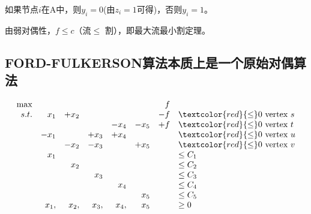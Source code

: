 \begin{itemize}
  \begin{small}
 \item  如果节点$i$在A中，则$y_i=0$(由$z_i=1$可得)，否则$y_i=1$。
 \item  由弱对偶性，$f\leq c$（流$\leq$ 割），即最大流最小割定理。
\end{small}
\end{itemize}
\subsection{{\sc FORD-FULKERSON}算法本质上是一个原始对偶算法}

\begin{small}
\[
\begin{array}{rrrrrrrl}
 \max &         &            &          &            &           &    f   &\\
 s.t.     & x_1  & +x_2 &           &            &           &-f   & \textcolor{red}{\leq} 0  \text{ vertex } s\\
        &        &             &           &    -x_4 & -x_5 &+f & \textcolor{red}{\leq} 0  \text{ vertex } t\\
        & -x_1&            & +x_3 &+x_4   &         &      & \textcolor{red}{\leq}0  \text{ vertex } u\\
        &         &-x_2    & -x_3   &            &+x_5 &     & \textcolor{red}{\leq}0  \text{ vertex } v\\
        & x_1  &           &            &            &          &     & \leq C_1 \\
        &   &   x_2        &            &            &          &     & \leq C_2 \\
        &        &           &  x_{3}          &            &          &     & \leq C_3 \\
        &        &           &            &      x_{4}      &          &     & \leq C_4 \\
        &        &           &            &            &   x_{5}       &     & \leq C_5 \\
        & x_1,  &  x_{2},         &   x_{3},         &    x_{4},        &  x_{5}        &     & \geq 0 \\
\end{array} \nonumber
\]
\end{small}

